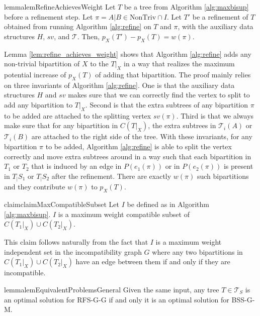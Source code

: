 \documentclass[twocolumn]{bmcart}%
\newcommand{\ntriv}{\mathrm{NonTriv}}
\newcommand{\bss}{\textsc{BSS}\xspace}
\newcommand{\rfs}{\textsc{RFS}\xspace}
\renewcommand{\G}{\textsc{G}\xspace}
\renewcommand{\M}{\textsc{M}\xspace}
\theoremstyle{mystyle}
\theoremstyle{proofstyle}
\begin{document}
 
\begin{restatable}{lemma}{lemRefineAchievesWeight} \label{lem:refine_achieves_weight}
Let $T$ be a tree from Algorithm \ref{alg:maxbisup} before a refinement step. Let $\pi = A|B \in \ntriv \cap I$. Let $T'$ be a refinement of $T$ obtained from running Algorithm \ref{alg:refine} on $T$ and $\pi$, with the auxiliary data structures $H$, $sv$, and $\mathcal{T}$. Then, $p_X(T') - p_X(T) = w(\pi)$. 
\end{restatable}
Lemma \ref{lem:refine_achieves_weight} shows that Algorithm \ref{alg:refine} adds any non-trivial bipartition of $X$ to the $T|_X$ in a way that realizes the maximum potential increase of $p_X(T)$ of adding that bipartition. The proof mainly relies on three invariants of Algorithm \ref{alg:refine}. One is that the auxiliary data structures $H$ and $sv$ makes sure that we can correctly find the vertex to split to add any bipartition to $T|_X$. Second is that the extra subtrees of any bipartition $\pi$ to be added are attached to the splitting vertex $sv(\pi)$. Third is that we always make sure that for any bipartition in $C(T|_X)$, the extra subtrees in $\mathcal{T}_i(A)$ or $\mathcal{T}_i(B)$ are attached to the right side of the tree. With these invariants, for any bipartition $\pi$ to be added, Algorithm \ref{alg:refine} is able to split the vertex correctly and move extra subtrees around in a way such that each bipartition in $T_1$ or $T_2$ that is induced by an edge in $P(e_1(\pi))$ or in $P(e_2(\pi))$ is present in $T_|{S_1}$ or $T_|{S_2}$ after the refinement. There are exactly $w(\pi)$ such bipartitions and they contribute $w(\pi)$ to $p_X(T)$. 


\begin{restatable}{claim}{claimMaxCompatibleSubset} \label{claim:max_compatible_subset}
    Let $I$ be defined as in Algorithm \ref{alg:maxbisup}. $I$ is a maximum weight compatible subset of $C(T_1|_X) \cup C(T_2|_X)$. 
\end{restatable}
This claim follows naturally from the fact that $I$ is a maximum weight independent set in the incompatibility graph $G$ where any two bipartitions in $C(T_1|_X) \cup C(T_2|_X)$ have an edge between them if and only if they are incompatible.

\begin{restatable}{lemma}{lemEquivalentProblemsGeneral} \label{lem: equivalence_RF_support_general}
Given the same input, any tree $T \in \mathcal{T}_S$ is an optimal solution for \rfs-\G-\G if and only it is an optimal solution for \bss-\G-\M.
\end{restatable}
\end{document}
